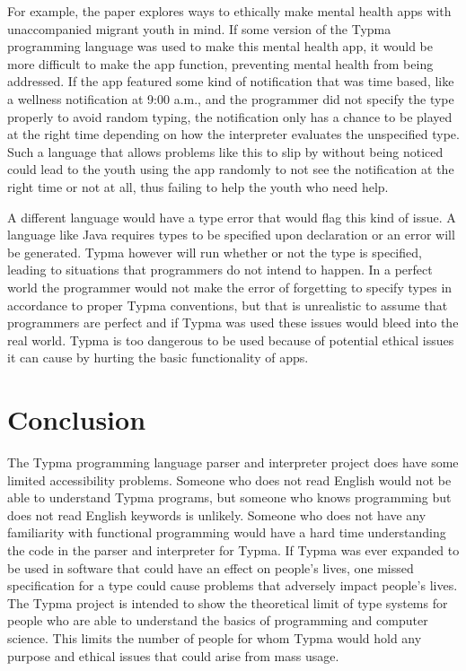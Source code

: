 \documentclass[10pt,twocolumn]{article}
\begin{document}
For example, the paper \textcite{Tachtler2021Unaccompanied} explores ways to ethically make mental health apps with unaccompanied migrant youth in mind. If some version of the Typma programming language was used to make this mental health app, it would be more difficult to make the app function, preventing mental health from being addressed. If the app featured some kind of notification that was time based, like a wellness notification at 9:00 a.m., and the programmer did not specify the type properly to avoid random typing, the notification only has a chance to be played at the right time depending on how the interpreter evaluates the unspecified type. Such a language that allows problems like this to slip by without being noticed could lead to the youth using the app randomly to not see the notification at the right time or not at all, thus failing to help the youth who need help. 

A different language would have a type error that would flag this kind of issue. A language like Java requires types to be specified upon declaration or an error will be generated. Typma however will run whether or not the type is specified, leading to situations that programmers do not intend to happen. In a perfect world the programmer would not make the error of forgetting to specify types in accordance to proper Typma conventions, but that is unrealistic to assume that programmers are perfect and if Typma was used these issues would bleed into the real world. Typma is too dangerous to be used because of potential ethical issues it can cause by hurting the basic functionality of apps.

\section{Conclusion}

The Typma programming language parser and interpreter project does have some limited accessibility problems. Someone who does not read English would not be able to understand Typma programs, but someone who knows programming but does not read English keywords is unlikely. Someone who does not have any familiarity with functional programming would have a hard time understanding the code in the parser and interpreter for Typma. If Typma was ever expanded to be used in software that could have an effect on people's lives, one missed specification for a type could cause problems that adversely impact people's lives. The Typma project is intended to show the theoretical limit of type systems for people who are able to understand the basics of programming and computer science. This limits the number of people for whom Typma would hold any purpose and ethical issues that could arise from mass usage.
\end{document}

